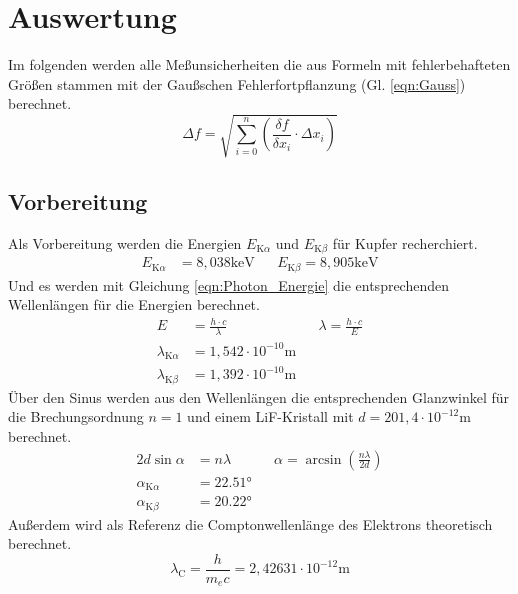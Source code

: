 \section{Auswertung}
\label{sec:Auswertung}

Im folgenden werden alle Meßunsicherheiten die aus Formeln mit fehlerbehafteten Größen stammen
mit der Gaußschen Fehlerfortpflanzung (Gl. \ref{eqn:Gauss}) berechnet.
\begin{equation}
    \Delta f =  \sqrt{\sum_{i=0}^n \left( \frac{\delta f}{\delta x_i} \cdot \Delta x_i\right)}   
    \label{eqn:Gauss}
\end{equation}

\subsection{Vorbereitung}
Als Vorbereitung werden die Energien $E_{\text{K}\alpha}$ und $E_{\text{K}\beta}$ für Kupfer recherchiert.
\begin{align*}
    E_{\text{K}\alpha} &= 8,038\text{keV}    &&   E_{\text{K}\beta} = 8,905\text{keV} \label{eqn:EnergieKupfer}
\end{align*}
Und es werden mit Gleichung \ref{eqn:Photon_Energie} die entsprechenden Wellenlängen für die Energien berechnet.
\begin{align*}
    E &= \frac{h\cdot c}{\lambda} && \lambda = \frac{h\cdot c}{E} \\
    \lambda_{\text{K}\alpha} &= 1,542\cdot 10^{-10} \text{m} \\
    \lambda_{\text{K}\beta} &= 1,392 \cdot 10^{-10} \text{m} 
\end{align*}
Über den Sinus werden aus den Wellenlängen die entsprechenden Glanzwinkel für die Brechungsordnung $n=1$ und einem LiF-Kristall mit $d = 201,4\cdot10^{-12} \text{m}$ berechnet.
\begin{align*}
   2d\sin{\alpha} &= n\lambda && \alpha = \arcsin \left(\frac{n\lambda}{2d}\right) \\
   \alpha_{\text{K}\alpha} &= 22.51° \\
   \alpha_{\text{K}\beta} &= 20.22°
\end{align*}
Außerdem wird als Referenz die Comptonwellenlänge des Elektrons theoretisch berechnet.
\begin{equation*}
    \lambda_{\text{C}} = \frac{h}{m_e c} = 2,42631 \cdot 10^{-12} \text{m}
\end{equation*}

